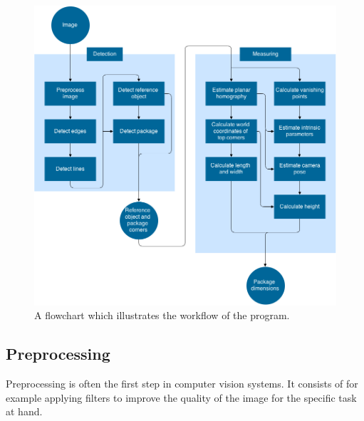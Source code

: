 \begin{figure}
\begin{center}
\includegraphics[width=1.0\textwidth]{figures/flowchart.png}
\end{center}
\caption[A flowchart illustrating the workflow of the program]{A flowchart which illustrates the workflow of the program.}
\label{fig:flowchart}
\end{figure}

\subsection{Preprocessing} \label{method:image_processing}
Preprocessing is often the first step in computer vision systems.
It consists of for example applying filters to improve the quality of the image for the specific task at hand.

